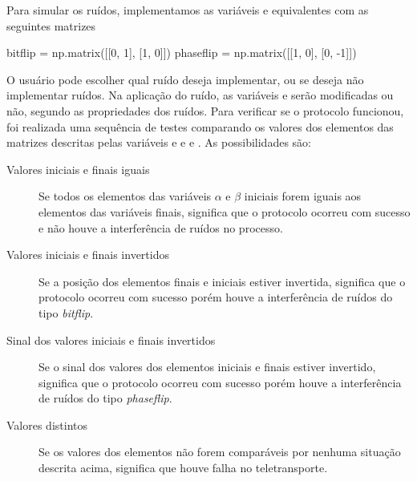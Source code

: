 Para simular os ruídos, implementamos as variáveis  e  equivalentes com as seguintes matrizes
\begin{pycode}
  bitflip = np.matrix([[0, 1], [1, 0]])
  phaseflip = np.matrix([[1, 0], [0, -1]])
\end{pycode}
O usuário pode escolher qual ruído deseja implementar, ou se deseja não implementar ruídos. Na aplicação do ruído, as variáveis  e  serão modificadas ou não, segundo as propriedades dos ruídos. Para verificar se o protocolo funcionou, foi realizada uma sequência de testes comparando os valores dos elementos das matrizes descritas pelas variáveis  e  e  e . As possibilidades são:
\begin{description}
  \item [Valores iniciais e finais iguais] Se todos os elementos das variáveis $\alpha$ e $\beta$ iniciais forem iguais aos elementos das variáveis finais, significa que o protocolo ocorreu com sucesso e não houve a interferência de ruídos no processo.
  \item [Valores iniciais e finais invertidos] Se a posição dos elementos finais e iniciais estiver invertida, significa que o protocolo ocorreu com sucesso porém houve a interferência de ruídos do tipo \textit{bitflip}.
  \item [Sinal dos valores iniciais e finais invertidos] Se o sinal dos valores dos elementos iniciais e finais estiver invertido, significa que o protocolo ocorreu com sucesso porém houve a interferência de ruídos do tipo \textit{phaseflip}.
  \item [Valores distintos] Se os valores dos elementos não forem comparáveis por nenhuma situação descrita acima, significa que houve falha no teletransporte.
\end{description}
